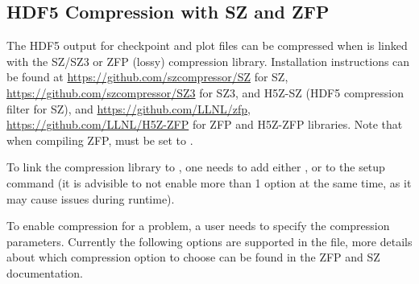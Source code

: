 \subsection{HDF5 Compression with SZ and ZFP}
The HDF5 output for checkpoint and plot files can be compressed when \flashx is 
linked with the SZ/SZ3 or ZFP (lossy) compression library.
Installation instructions can be found at \url{https://github.com/szcompressor/SZ}
for SZ, \url{https://github.com/szcompressor/SZ3} for SZ3, and H5Z-SZ 
(HDF5 compression filter for SZ), and \url{https://github.com/LLNL/zfp}, 
\url{https://github.com/LLNL/H5Z-ZFP} for ZFP and H5Z-ZFP libraries.
Note that when compiling ZFP,  must be set to .

To link the compression library to \flashx, one needs to add either , 
 or  to the setup command (it is advisible to not enable 
more than 1 option at the same time, as it may cause issues during runtime).

To enable compression for a \flashx problem, a user needs to specify the compression parameters.
Currently the following options are supported in the  file, more details
about which compression option to choose can be found in the ZFP and SZ documentation.

